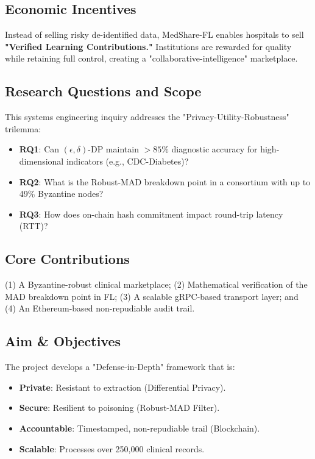 \documentclass[10pt, a4paper, twocolumn]{article}
\begin{document}
\subsection{Economic Incentives}
Instead of selling risky de-identified data, MedShare-FL enables hospitals to sell \textbf{"Verified Learning Contributions."} Institutions are rewarded for quality while retaining full control, creating a "collaborative-intelligence" marketplace.

\subsection{Research Questions and Scope}
This systems engineering inquiry addresses the "Privacy-Utility-Robustness" trilemma:
\begin{itemize}[leftmargin=*, nosep]
    \item \textbf{RQ1}: Can $(\epsilon, \delta)$-DP maintain $>85\%$ diagnostic accuracy for high-dimensional indicators (e.g., CDC-Diabetes)?
    \item \textbf{RQ2}: What is the Robust-MAD breakdown point in a consortium with up to 49\% Byzantine nodes?
    \item \textbf{RQ3}: How does on-chain hash commitment impact round-trip latency (RTT)?
\end{itemize}

\subsection{Core Contributions}
(1) A Byzantine-robust clinical marketplace; (2) Mathematical verification of the MAD breakdown point in FL; (3) A scalable gRPC-based transport layer; and (4) An Ethereum-based non-repudiable audit trail.

\subsection{Aim \& Objectives}
The project develops a "Defense-in-Depth" framework that is:
\begin{itemize}[leftmargin=*, nosep]
    \item \textbf{Private}: Resistant to extraction (Differential Privacy).
    \item \textbf{Secure}: Resilient to poisoning (Robust-MAD Filter).
    \item \textbf{Accountable}: Timestamped, non-repudiable trail (Blockchain).
    \item \textbf{Scalable}: Processes over 250,000 clinical records.
\end{itemize}
\end{document}
